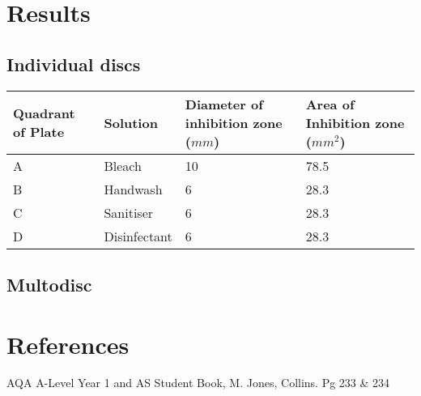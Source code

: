 \documentclass{thomasClass}
\begin{document}
\section{Results}
\subsection{Individual discs}
\begin{table}[H]
\centering
\begin{tabularx}{0.8\textwidth}{X|X|X|X}
Quadrant of Plate & Solution & Diameter of inhibition zone ($mm$) & Area of Inhibition zone ($mm^2$) \\
\hline
A & Bleach & 10 & 78.5 \\
B & Handwash & 6 & 28.3 \\
C & Sanitiser & 6 & 28.3 \\
D & Disinfectant & 6 & 28.3
\end{tabularx}
\end{table}
\subsection{Multodisc}

\section{References}
AQA A-Level Year 1 and AS Student Book, M. Jones, Collins. Pg 233 \& 234
\end{document}
